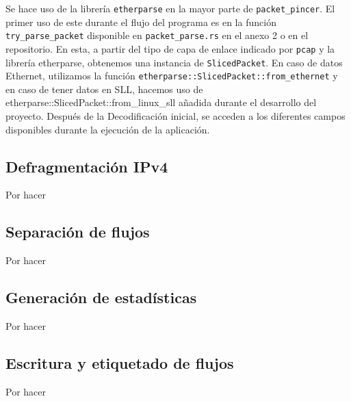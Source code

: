 Se hace uso de la librería \texttt{etherparse} en la mayor parte de \texttt{packet\_pincer}. El primer uso de este durante el flujo del programa es en la función \texttt{try\_parse\_packet} disponible en \texttt{packet\_parse.rs} en el anexo 2 o en el repositorio. En esta, a partir del tipo de capa de enlace indicado por \texttt{pcap} y la librería etherparse, obtenemos una instancia de \texttt{SlicedPacket}. En caso de datos Ethernet, utilizamos la función \texttt{etherparse::SlicedPacket::from\_ethernet} y en caso de tener datos en SLL, hacemos uso de {etherparse::SlicedPacket::from\_linux\_sll} añadida durante el desarrollo del proyecto. Después de la Decodificación inicial, se acceden a los diferentes campos disponibles durante la ejecución de la aplicación.

\subsection{Defragmentación IPv4}

Por hacer

\subsection{Separación de flujos}

Por hacer

\subsection{Generación de estadísticas}

Por hacer

\subsection{Escritura y etiquetado de flujos}

Por hacer

